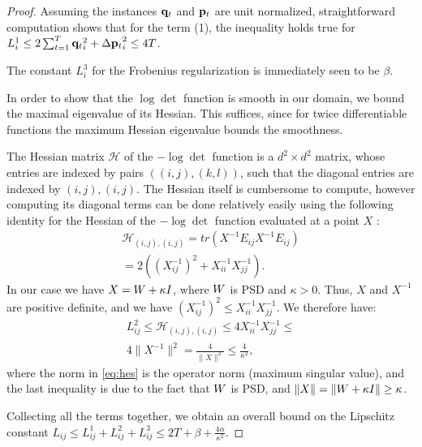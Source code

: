 \documentclass{article}
\begin{document}
{\begin{proof}
Assuming the instances ${{\mathbf{q}}_{{t}}}$ and ${{\mathbf{p}}_{{t}}}$ are unit normalized, straightforward computation shows that for the term (1), the inequality holds true for $L^1_i \leq 2 \sum_{t=1}^T {{\mathbf{q}}_{{t}}}_i^2 +{\Delta\mathbf{p}_{t}}_i^2 \leq 4T$.

The constant $L^3_{i}$ for the Frobenius regularization is immediately seen to be $\beta$.


In order to show that the $\log \det$ function is smooth in our domain, we bound the maximal eigenvalue of its Hessian. This suffices, since for twice differentiable functions the maximum Hessian eigenvalue bounds the smoothness.


The Hessian matrix $\mathcal{H}$ of the $- \log \det$ function is a $d^2 \times d^2$ matrix, whose entries are indexed by pairs $((i,j),(k,l))$, such that the diagonal entries are indexed by $(i,j),(i,j)$. The Hessian itself is cumbersome to compute, however computing its diagonal terms can be done relatively easily using the following identity for the Hessian of the $-\log \det$ function evaluated at a point $X$ \citep{boyd2004convex}:  
\begin{align*}
\mathcal{H}_{(i,j),(i,j)} = tr\left(X^{-1}E_{ij} X^{-1}E_{ij}\right)  \\
= 2 \left((X^{-1}_{ij})^2 + X^{-1}_{ii}X^{-1}_{jj}\right).
\end{align*}
In our case we have $X = {W}+\kappa I$, where ${W}$ is PSD and $\kappa >0$. Thus, $X$ and $X^{-1}$ are positive definite, and we have $(X^{-1}_{ij})^2 \leq X^{-1}_{ii}X^{-1}_{jj}$. We therefore have:
\begin{align}
\label{eq:hes}
L^2_{ij} \leq  \mathcal{H}_{(i,j),(i,j)} \leq 4 X^{-1}_{ii}X^{-1}_{jj} \leq \nonumber \\
4 \|X^{-1}\|^2 = \frac{4}{\|X\|^2} \leq \frac{4}{\kappa^2},
\end{align}
where the norm in \ref{eq:hes} is the operator norm (maximum singular value), and the last inequality is due to the fact that ${W}$ is PSD, and $\|X\| = \| {W} + \kappa I\| \geq \kappa$.

Collecting all the terms together, we obtain an overall bound on the Lipschitz constant $L_{ij} \leq L^1_{ij} + L^2_{ij} + L^3_{ij} \leq 2 T + \beta + \frac{4 \alpha}{\kappa ^2}.$


\end{proof}}
\end{document}
